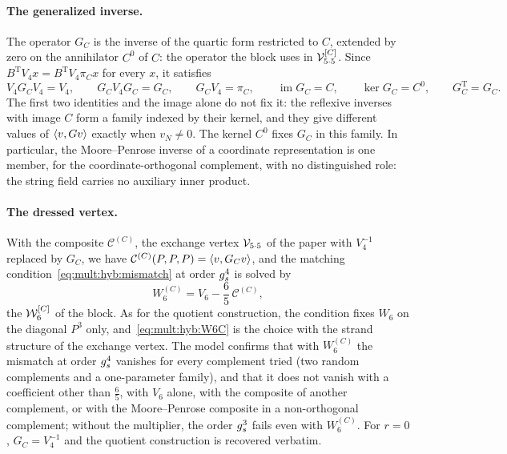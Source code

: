 \paragraph{The generalized inverse.}
The operator $G_C$ is the inverse of the quartic form restricted to $C$, extended by zero on the annihilator $C^0$ of $C$: the operator the block uses in $\mathcal{V}_{5 \cdot 5}^{[C]}$.
Since $B^{\mathrm{T}} V_4 x = B^{\mathrm{T}} V_4 \pi_C x$ for every $x$, it satisfies
\begin{equation}
  V_4 G_C V_4
    = V_4,
  \qquad
  G_C V_4 G_C
    = G_C,
  \qquad
  G_C V_4
    = \pi_C,
  \qquad
  \operatorname{im} G_C
    = C,
  \qquad
  \ker G_C
    = C^0,
  \qquad
  G_C^{\mathrm{T}}
    = G_C.
\end{equation}
The first two identities and the image alone do not fix it: the reflexive inverses with image $C$ form a family indexed by their kernel, and they give different values of $\braket{v, G v}$ exactly when $v_N \neq 0$.
The kernel $C^0$ fixes $G_C$ in this family.
In particular, the Moore--Penrose inverse of a coordinate representation is one member, for the coordinate-orthogonal complement, with no distinguished role: the string field carries no auxiliary inner product.

\paragraph{The dressed vertex.}
With the composite $\mathcal C^{(C)}$, the exchange vertex $\mathcal{V}_{5 \cdot 5}$ of the paper with $V_4^{-1}$ replaced by $G_C$, we have $\mathcal C^{(C)}(P, P, P) = \braket{v, G_C v}$, and the matching condition~\eqref{eq:mult:hyb:mismatch} at order $g_s^4$ is solved by
\begin{equation}
  \label{eq:mult:hyb:W6C}
  W_6^{(C)}
    = V_6 - \frac{6}{5} \, \mathcal C^{(C)},
\end{equation}
the $\mathcal{W}_{6}^{[C]}$ of the block.
As for the quotient construction, the condition fixes $W_6$ on the diagonal $P^3$ only, and~\eqref{eq:mult:hyb:W6C} is the choice with the strand structure of the exchange vertex.
The model confirms that with $W_6^{(C)}$ the mismatch at order $g_s^4$ vanishes for every complement tried (two random complements and a one-parameter family), and that it does not vanish with a coefficient other than $\frac{6}{5}$, with $V_6$ alone, with the composite of another complement, or with the Moore--Penrose composite in a non-orthogonal complement; without the multiplier, the order $g_s^3$ fails even with $W_6^{(C)}$.
For $r = 0$, $G_C = V_4^{-1}$ and the quotient construction is recovered verbatim.

